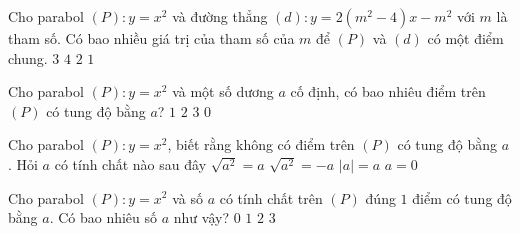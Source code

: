 \begin{bt}
Cho parabol $(P):y=x^2$ và đường thẳng $(d):y=2(m^2-4)x-m^2$ với $m$ là tham số. Có bao nhiều giá trị  của tham số của $m$ để $(P)$ và $(d)$ có một điểm chung.
\choice
{$3$}
{$4$}
{\True $2$}
{$1$}

\end{bt}
\begin{bt}
Cho parabol $(P):y=x^2$ và một số dương $a$ cố định, có bao nhiêu điểm trên $(P)$ có tung độ bằng $a$?
\choice
{$1$}
{\True $2$}
{$3$}
{$0$}
\end{bt}
\begin{bt}
	Cho parabol $(P):y=x^2$, biết rằng không có điểm trên $(P)$ có tung độ bằng $a$. Hỏi $a$ có tính chất nào sau đây
	\choice
	{$\sqrt{a^2}=a$}
	{\True $\sqrt{a^2}=-a$}
	{$|a|=a$}
	{$a=0$}
\end{bt}
\begin{bt}
	Cho parabol $(P):y=x^2$ và số $a$ có tính chất trên $(P)$ đúng $1$ điểm  có tung độ bằng $a$. Có bao nhiêu số $a$ như vậy?
	\choice
	{$0$}
	{\True $1$}
	{$2$}
	{$3$}
\end{bt}
